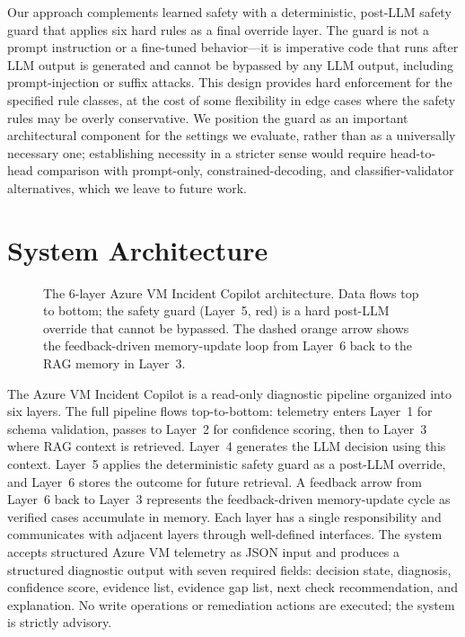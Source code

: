 \documentclass[a4paper,10pt,journal,compsoc]{IEEEtran}
\begin{document}
Our approach complements learned safety with a deterministic, post-LLM
safety guard that applies six hard rules as a final override layer.
The guard is not a prompt instruction or a fine-tuned behavior---it is
imperative code that runs after LLM output is generated and cannot be
bypassed by any LLM output, including prompt-injection or suffix
attacks. This design provides hard enforcement for the specified rule
classes, at the cost of some flexibility in
edge cases where the safety rules may be overly conservative. We
position the guard as an important architectural component for the
settings we evaluate, rather than as a universally necessary one;
establishing necessity in a stricter sense would require head-to-head
comparison with prompt-only, constrained-decoding, and
classifier-validator alternatives, which we leave to future work.

\section{System Architecture}

\begin{figure}[!t]
  \centering
  
  \caption{The 6-layer Azure VM Incident Copilot architecture.
    Data flows top to bottom; the safety guard (Layer~5, red) is a
    hard post-LLM override that cannot be bypassed.
    The dashed orange arrow shows the feedback-driven memory-update loop
    from Layer~6 back to the RAG memory in Layer~3.}
  \label{fig:architecture}
\end{figure}

The Azure VM Incident Copilot is a read-only diagnostic pipeline
organized into six layers. The full pipeline flows top-to-bottom:
telemetry enters Layer~1 for schema validation, passes to Layer~2 for
confidence scoring, then to Layer~3 where RAG context is retrieved.
Layer~4 generates the LLM decision using this context. Layer~5 applies
the deterministic safety guard as a post-LLM override, and Layer~6
stores the outcome for future retrieval. A feedback arrow from Layer~6
back to Layer~3 represents the feedback-driven memory-update cycle as verified cases
accumulate in memory. Each layer has a single responsibility and
communicates with adjacent layers through well-defined interfaces. The
system accepts structured Azure VM telemetry as JSON input and produces
a structured diagnostic output with seven required fields: decision
state, diagnosis, confidence score, evidence list, evidence gap list,
next check recommendation, and explanation. No write operations or
remediation actions are executed; the system is strictly advisory.
\end{document}
